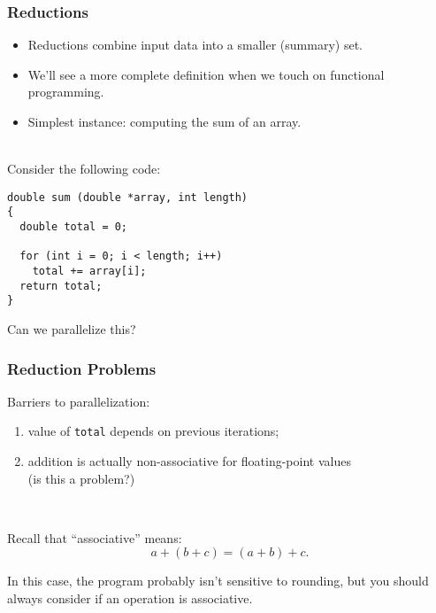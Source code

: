 \documentclass[aspectratio=43]{beamer}
\newenvironment{changemargin}[1]{%
  \begin{list}{}{%
    \setlength{\topsep}{0pt}%
    \setlength{\leftmargin}{#1}%
    \setlength{\rightmargin}{1em}
    \setlength{\listparindent}{\parindent}%
    \setlength{\itemindent}{\parindent}%
    \setlength{\parsep}{\parskip}%
  }%
  \item[]}{\end{list}}
\begin{document}
\begin{frame}[fragile]
  \frametitle{Reductions}

\begin{changemargin}{2.5cm}
  \begin{itemize}
    \item Reductions combine input data into a smaller (summary) set.
    \item We'll see a more complete definition when we touch on functional
      programming.
    \item Simplest instance: computing the sum of an array.
  \end{itemize}
~\\

  Consider the following code:

  \begin{lstlisting}
double sum (double *array, int length)
{
  double total = 0;

  for (int i = 0; i < length; i++)
    total += array[i];
  return total;
}
  \end{lstlisting}

  Can we parallelize this? 
\end{changemargin}
\end{frame}

\begin{frame}[fragile]
  \frametitle{Reduction Problems}

\begin{changemargin}{1cm}
  Barriers to parallelization:
  \begin{enumerate}
    \item value of {\tt total} depends on previous
      iterations;
    \item addition is actually non-associative for floating-point values
      \\ (is this a problem?)
  \end{enumerate}
  ~\\[1em]
  \begin{center}
    Recall that ``associative'' means: 
     \[a + (b + c) = (a + b) + c.\]
  \end{center}
     In this case, the program probably isn't sensitive to rounding,
      but you should always consider if an operation is associative.
\end{changemargin}
\end{frame}
\end{document}

